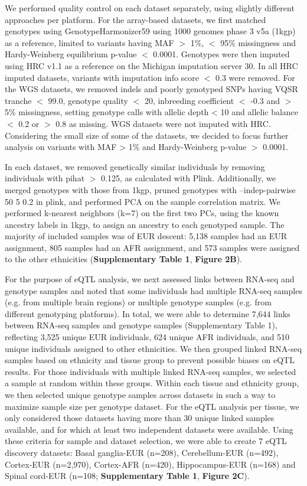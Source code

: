 We performed quality control on each dataset separately, using slightly different approaches per platform. For the array-based datasets, we first matched genotypes using GenotypeHarmonizer59 using 1000 genomes phase 3 v5a (1kgp) as a reference, limited to variants having MAF $>$ 1\%, $<$ 95\% missingness and Hardy-Weinberg equilibrium p-value $<$ 0.0001. Genotypes were then imputed using HRC v1.1 as a reference on the Michigan imputation server 30. In all HRC imputed datasets, variants with imputation info score $<$ 0.3 were removed. For the WGS datasets, we removed indels and poorly genotyped SNPs having VQSR tranche $<$ 99.0, genotype quality $<$ 20, inbreeding coefficient $<$ -0.3 and $>$ 5\% missingness, setting genotype calls with allelic depth < 10 and allelic balance $<$ 0.2 or $>$ 0.8 as missing. WGS datasets were not imputed with HRC. Considering the small size of some of the datasets, we decided to focus further analysis on variants with MAF > 1\% and Hardy-Weinberg p-value $>$ 0.0001. 

In each dataset, we removed genetically similar individuals by removing individuals with pihat $>$ 0.125, as calculated with Plink. Additionally, we merged genotypes with those from 1kgp, pruned genotypes with --indep-pairwise 50 5 0.2 in plink, and performed PCA on the sample correlation matrix. We performed k-nearest neighbors (k=7) on the first two PCs, using the known ancestry labels in 1kgp, to assign an ancestry to each genotyped sample. The majority of included samples was of EUR descent: 5,138 samples had an EUR assignment, 805 samples had an AFR assignment, and 573 samples were assigned to the other ethnicities (\textbf{Supplementary Table 1}, \textbf{Figure 2B}). 

For the purpose of eQTL analysis, we next assessed links between RNA-seq and genotype samples and noted that some individuals had multiple RNA-seq samples (e.g. from multiple brain regions) or multiple genotype samples (e.g. from different genotyping platforms). In total, we were able to determine 7,644 links between RNA-seq samples and genotype samples (Supplementary Table 1), reflecting 3,525 unique EUR individuals, 624 unique AFR individuals, and 510 unique individuals assigned to other ethnicities. We then grouped linked RNA-seq samples based on ethnicity and tissue group to prevent possible biases on eQTL results. For those individuals with multiple linked RNA-seq samples, we selected a sample at random within these groups. Within each tissue and ethnicity group, we then selected unique genotype samples across datasets in such a way to maximize sample size per genotype dataset. For the eQTL analysis per tissue, we only considered those datasets having more than 30 unique linked samples available, and for which at least two independent datasets were available. Using these criteria for sample and dataset selection, we were able to create 7 eQTL discovery datasets: Basal ganglia-EUR (n=208), Cerebellum-EUR (n=492), Cortex-EUR (n=2,970), Cortex-AFR (n=420), Hippocampus-EUR (n=168) and Spinal cord-EUR (n=108; \textbf{Supplementary Table 1}, \textbf{Figure 2C}). 


